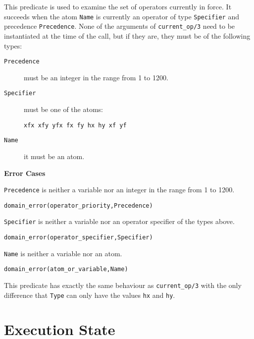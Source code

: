 \begin{description}
    This predicate is used to examine the set of operators currently
    in force.  It succeeds when the atom {\tt Name} is currently an
    operator of type {\tt Specifier} and precedence {\tt Precedence}.  None
    of the arguments of {\tt current\_op/3} need to be instantiated at
    the time of the call, but if they are, they must be of the
    following types: 
\begin{description}
\item[{\tt Precedence}] must be an integer in the range from 1 to 1200.  
\item[{\tt Specifier}] must be one of the atoms: 
\begin{verbatim} 
xfx xfy yfx fx fy hx hy xf yf 
\end{verbatim} 
\item[{\tt Name}] it must be an atom.
\end{description}

{\bf Error Cases}
\bi
\item 	{\tt Precedence} is neither a variable nor an integer in the
range from 1 to 1200. 
\bi
\item 	{\tt domain\_error(operator\_priority,Precedence)}
\ei
\item 	{\tt Specifier} is neither a variable nor an operator
specifier of the types above.
\bi
\item 	{\tt domain\_error(operator\_specifier,Specifier)}
\ei
\item 	{\tt Name} is neither a variable nor an atom.
\bi
\item 	{\tt domain\_error(atom\_or\_variable,Name)}
\ei
\ei

    This predicate has exactly the same behaviour as {\tt current\_op/3}
    with the only difference that {\tt Type} can only have the values
    {\tt hx} and {\tt hy}.
\end{description}




\section{Execution State}\label{environmental}

